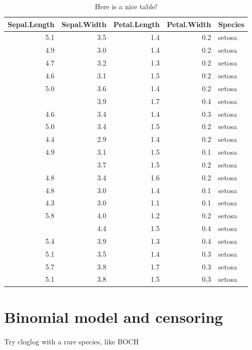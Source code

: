 \documentclass[12pt,]{book}
\begin{document}
\begin{table}[t]

\caption{\label{tab:nice-tab}Here is a nice table!}
\centering
\begin{tabular}{rrrrl}
\toprule
Sepal.Length & Sepal.Width & Petal.Length & Petal.Width & Species\\
\midrule
5.1 & 3.5 & 1.4 & 0.2 & setosa\\
4.9 & 3.0 & 1.4 & 0.2 & setosa\\
4.7 & 3.2 & 1.3 & 0.2 & setosa\\
4.6 & 3.1 & 1.5 & 0.2 & setosa\\
5.0 & 3.6 & 1.4 & 0.2 & setosa\\
\addlinespace
5.4 & 3.9 & 1.7 & 0.4 & setosa\\
4.6 & 3.4 & 1.4 & 0.3 & setosa\\
5.0 & 3.4 & 1.5 & 0.2 & setosa\\
4.4 & 2.9 & 1.4 & 0.2 & setosa\\
4.9 & 3.1 & 1.5 & 0.1 & setosa\\
\addlinespace
5.4 & 3.7 & 1.5 & 0.2 & setosa\\
4.8 & 3.4 & 1.6 & 0.2 & setosa\\
4.8 & 3.0 & 1.4 & 0.1 & setosa\\
4.3 & 3.0 & 1.1 & 0.1 & setosa\\
5.8 & 4.0 & 1.2 & 0.2 & setosa\\
\addlinespace
5.7 & 4.4 & 1.5 & 0.4 & setosa\\
5.4 & 3.9 & 1.3 & 0.4 & setosa\\
5.1 & 3.5 & 1.4 & 0.3 & setosa\\
5.7 & 3.8 & 1.7 & 0.3 & setosa\\
5.1 & 3.8 & 1.5 & 0.3 & setosa\\
\bottomrule
\end{tabular}
\end{table}

\hypertarget{binomial-model-and-censoring}{%
\section{Binomial model and censoring}\label{binomial-model-and-censoring}}

Try cloglog with a rare species, like BOCH
\end{document}
